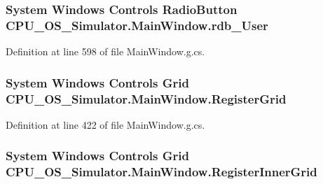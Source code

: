 \subsubsection[{rdb\+\_\+\+User}]{\setlength{\rightskip}{0pt plus 5cm}System Windows Controls Radio\+Button C\+P\+U\+\_\+\+O\+S\+\_\+\+Simulator.\+Main\+Window.\+rdb\+\_\+\+User\hspace{0.3cm}{\ttfamily [package]}}\label{class_c_p_u___o_s___simulator_1_1_main_window_ab9e8d52c337bc24a24d8282dfbf449c8}


Definition at line 598 of file Main\+Window.\+g.\+cs.

\hypertarget{class_c_p_u___o_s___simulator_1_1_main_window_a37acb139db0aa54950350fdb47dfd452}{}
\subsubsection[{Register\+Grid}]{\setlength{\rightskip}{0pt plus 5cm}System Windows Controls Grid C\+P\+U\+\_\+\+O\+S\+\_\+\+Simulator.\+Main\+Window.\+Register\+Grid\hspace{0.3cm}{\ttfamily [package]}}\label{class_c_p_u___o_s___simulator_1_1_main_window_a37acb139db0aa54950350fdb47dfd452}


Definition at line 422 of file Main\+Window.\+g.\+cs.

\hypertarget{class_c_p_u___o_s___simulator_1_1_main_window_a27d2d9e2ed92e2daa444ca8086a0861e}{}
\subsubsection[{Register\+Inner\+Grid}]{\setlength{\rightskip}{0pt plus 5cm}System Windows Controls Grid C\+P\+U\+\_\+\+O\+S\+\_\+\+Simulator.\+Main\+Window.\+Register\+Inner\+Grid\hspace{0.3cm}{\ttfamily [package]}}\label{class_c_p_u___o_s___simulator_1_1_main_window_a27d2d9e2ed92e2daa444ca8086a0861e}


